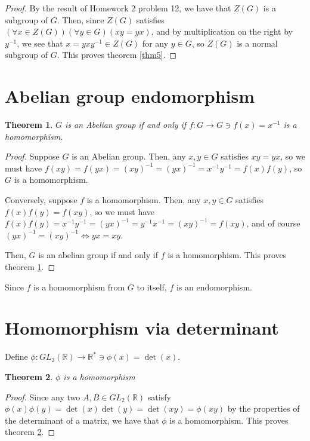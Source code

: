 \documentclass[12pt]{article}
\newcommand{\reals}{\mathbb{R}}
\newcommand{\gltwo}{GL_2(\reals)}
\newtheorem{thm}{Theorem}
\begin{document}
\begin{proof}
	By the result of Homework 2 problem 12,
	we have that $Z(G)$ is a subgroup of $G$.
	Then, since $Z(G)$ satisfies $(\forall x\in Z(G))(\forall y \in G)(xy = yx)$,
	and by multiplication on the right by $y^{-1}$,
	we see that $x = yxy^{-1} \in Z(G)$ for any $y \in G$,
	so $Z(G)$ is a normal subgroup of $G$.
	This proves theorem \ref{thm5}.
\end{proof}

\section{Abelian group endomorphism}

\begin{thm} \label{thm6}
	$G$ is an Abelian group
	if and only if
	$f:G \to G \ni f(x) = x^{-1}$ is a homomorphism.
\end{thm}

\begin{proof}
	Suppose $G$ is an Abelian group.
	Then, any $x,y \in G$ satisfies $xy = yx$,
	so we must have $f(xy) = f(yx) = (xy)^{-1} = (yx)^{-1} = x^{-1}y^{-1} = f(x)f(y)$,
	so $G$ is a homomorphism.

	Conversely, suppose $f$ is a homomorphism.
	Then, any $x,y \in G$ satisfies $f(x)f(y) = f(xy)$,
	so we must have $f(x)f(y) = x^{-1}y^{-1} = (yx)^{-1} = y^{-1}x^{-1} = (xy)^{-1} = f(xy)$,
	and of course $(yx)^{-1} = (xy)^{-1} \iff yx = xy$.

	Then, $G$ is an abelian group
	if and only if
	$f$ is a homomorphism.
	This proves theorem \ref{thm6}.
\end{proof}

Since $f$ is a homomorphism from $G$ to itself,
$f$ is an endomorphism.

\section{Homomorphism via determinant}

Define $\phi: \gltwo \to \reals^* \ni \phi(x) = \det(x)$.

\begin{thm} \label{thm7}
	$\phi$ is a homomorphism
\end{thm}

\begin{proof}
	Since any two $A,B \in \gltwo$ satisfy
	$\phi(x)\phi(y) = \det(x)\det(y) = \det(xy) = \phi(xy)$
	by the properties of the determinant of a matrix,
	we have that $\phi$ is a homomorphism.
	This proves theorem \ref{thm7}.
\end{proof}
\end{document}
